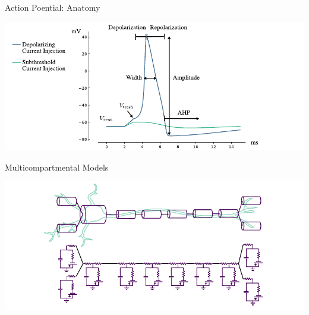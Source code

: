 \documentclass[aspectratio=169]{beamer}
\begin{document}
\begin{frame}{Action Poential: Anatomy}
    \begin{center}
        \includegraphics[width=\textwidth]{images/action_potential.pdf}
    \end{center}
\end{frame}

\begin{frame}{Multicompartmental Models}
    \begin{center}
        \includegraphics[width=\textwidth]{images/compartments.pdf}
    \end{center}
\end{frame}
\end{document}
